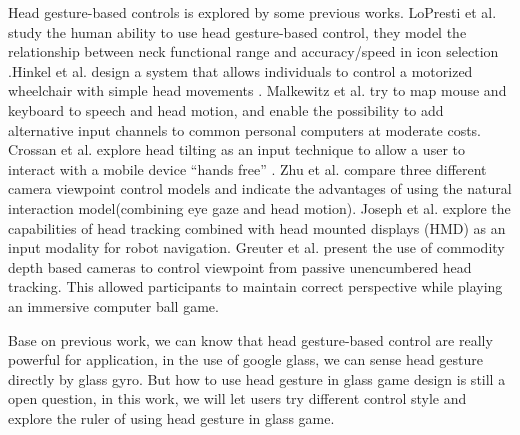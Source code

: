 Head gesture-based controls is explored by some previous works. LoPresti et al\cite{neck}. study the human ability to use head gesture-based control, they model the relationship between neck functional range and accuracy/speed in icon selection .Hinkel et al.\cite{wheel} design a system that allows individuals to control a motorized wheelchair with simple head movements . Malkewitz et al.\cite{headdesktop} try to map mouse and keyboard to speech and head motion, and enable the possibility to add alternative input channels to common personal computers at moderate costs. Crossan et al.\cite{tilt} explore head tilting as an input technique to allow a user to interact with a mobile device ``hands free'' . Zhu et al.\cite{tele} compare three different camera viewpoint control models and indicate the advantages of using the natural interaction model(combining eye gaze and head motion). Joseph et al.\cite{robot} explore the capabilities of head tracking combined with head mounted displays (HMD) as an input modality for robot navigation. Greuter et al.\cite{viewport} present the use of commodity depth based cameras to control viewpoint from passive unencumbered head tracking. This allowed participants to maintain correct perspective while playing an immersive computer ball game.

Base on previous work, we can know that head gesture-based control are really powerful for application, in the use of google glass, we can sense head gesture directly by glass gyro. But how to use head gesture in glass game design is still a open question, in this work, we will let users try different control style and explore the ruler of using head gesture in glass game.




